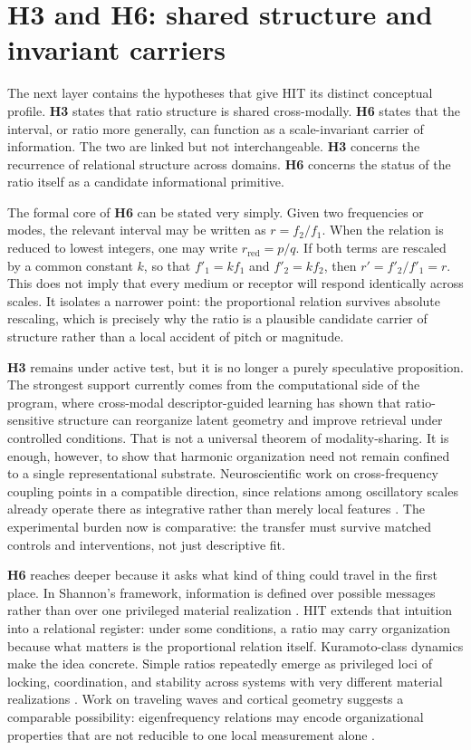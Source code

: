 \section{H3 and H6: shared structure and invariant carriers}

The next layer contains the hypotheses that give HIT its distinct conceptual profile. \textbf{H3} states that ratio structure is shared cross-modally. \textbf{H6} states that the interval, or ratio more generally, can function as a scale-invariant carrier of information. The two are linked but not interchangeable. \textbf{H3} concerns the recurrence of relational structure across domains. \textbf{H6} concerns the status of the ratio itself as a candidate informational primitive.

The formal core of \textbf{H6} can be stated very simply. Given two frequencies or modes, the relevant interval may be written as $r = f_2 / f_1$. When the relation is reduced to lowest integers, one may write $r_{\mathrm{red}} = p / q$. If both terms are rescaled by a common constant $k$, so that $f'_1 = k f_1$ and $f'_2 = k f_2$, then $r' = f'_2 / f'_1 = r$. This does not imply that every medium or receptor will respond identically across scales. It isolates a narrower point: the proportional relation survives absolute rescaling, which is precisely why the ratio is a plausible candidate carrier of structure rather than a local accident of pitch or magnitude.

\textbf{H3} remains under active test, but it is no longer a purely speculative proposition. The strongest support currently comes from the computational side of the program, where cross-modal descriptor-guided learning has shown that ratio-sensitive structure can reorganize latent geometry and improve retrieval under controlled conditions. That is not a universal theorem of modality-sharing. It is enough, however, to show that harmonic organization need not remain confined to a single representational substrate. Neuroscientific work on cross-frequency coupling points in a compatible direction, since relations among oscillatory scales already operate there as integrative rather than merely local features \parencite{canolty_2010}. The experimental burden now is comparative: the transfer must survive matched controls and interventions, not just descriptive fit.

\textbf{H6} reaches deeper because it asks what kind of thing could travel in the first place. In Shannon's framework, information is defined over possible messages rather than over one privileged material realization \parencite{shannon_1948}. HIT extends that intuition into a relational register: under some conditions, a ratio may carry organization because what matters is the proportional relation itself. Kuramoto-class dynamics make the idea concrete. Simple ratios repeatedly emerge as privileged loci of locking, coordination, and stability across systems with very different material realizations \parencite{kuramoto_1984}. Work on traveling waves and cortical geometry suggests a comparable possibility: eigenfrequency relations may encode organizational properties that are not reducible to one local measurement alone \parencite{jacobs_2025}.

